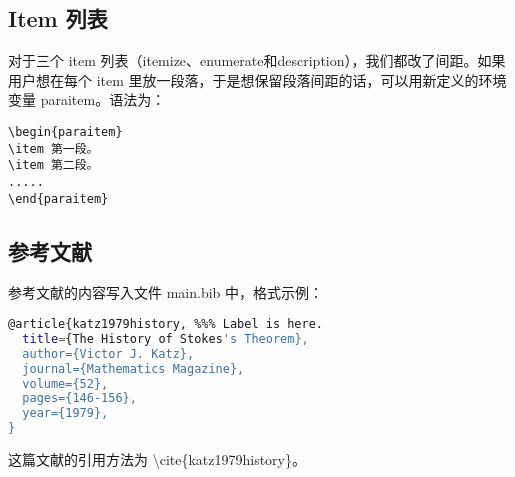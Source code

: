 \subsection{Item 列表}
对于三个 item 列表（itemize、enumerate和description），我们都改了间距。如果用户想在每个 item 里放一段落，于是想保留段落间距的话，可以用新定义的环境变量 paraitem。语法为：
\begin{lstlisting}[language={[LaTeX]TeX},caption={保留段落间距的环境变量}]
\begin{paraitem}
\item 第一段。
\item 第二段。
.....
\end{paraitem}
\end{lstlisting}

\subsection{参考文献}
参考文献的内容写入文件 main.bib 中，格式示例：
\begin{lstlisting}[language={sh},caption={参考文献格式示例}]
@article{katz1979history, %%% Label is here.
  title={The History of Stokes's Theorem},
  author={Victor J. Katz},
  journal={Mathematics Magazine},
  volume={52},
  pages={146-156},
  year={1979},
}
\end{lstlisting}

这篇文献的引用方法为 \textbackslash cite\{katz1979history\}。
